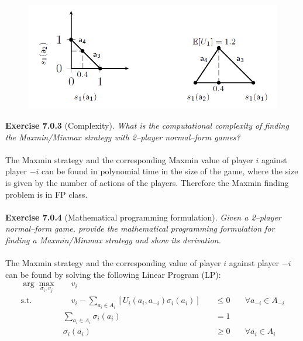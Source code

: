 \begin{figure}[H]
\centering
\includegraphics[scale=0.6]{images/img_2_7_02.png}
\end{figure}
\noindent
\textbf{Exercise 7.0.3} (Complexity). \textit{What is the computational complexity of finding the Maxmin/Minmax strategy with 2–player normal–form games?}\\\\
The Maxmin strategy and the corresponding Maxmin value of player $i$ against player $-i$ can be found in polynomial time in the size of the game, where the size is given by the number of actions of the players. Therefore the Maxmin finding problem is in \textsf{FP} class.\\\\
\textbf{Exercise 7.0.4} (Mathematical programming formulation). \textit{Given a 2–player normal–form game, provide the mathematical programming formulation for finding a Maxmin/Minmax strategy and show its derivation.}\\\\
The Maxmin strategy and the corresponding value of player $ i $
against player $ -i $ can be found by solving the following Linear Program (LP):
$$
\begin{aligned}
\arg \max_{\sigma_{i}, v_j} & \quad v_{i} \\
\text{s.t.} & \quad v_{i}-\sum_{a_{i} \in A_{i}}\left[U_{i}\left(a_{i}, a_{-i}\right) \sigma_{i}\left(a_{i}\right)\right] & \quad \leqslant 0 & \quad \forall a_{-i} \in A_{-i} \\
& \sum_{a_{i} \in A_{i}} \sigma_{i}\left(a_{i}\right) & \quad =1 &\\
& \sigma_{i}\left(a_{i}\right) & \quad \geqslant  0 & \quad \forall a_{i} \in A_{i}
\end{aligned}
$$
